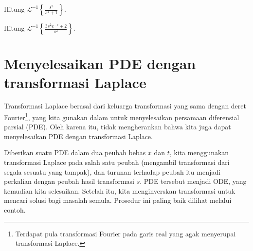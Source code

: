 \begin{exercise}
Hitung
${\mathcal{L}}^{-1} \left\{ \frac{s^2}{s^2+1} \right\}$.
\end{exercise}

\begin{exercise}
Hitung
${\mathcal{L}}^{-1} \left\{ \frac{3 s^2 e^{-s} + 2}{s^2} \right\}$.
\end{exercise}


\sectionnewpage
\section{Menyelesaikan PDE dengan transformasi Laplace}
\label{laplacepde:section}


Transformasi Laplace berasal dari keluarga transformasi yang sama dengan
deret Fourier\footnote{Terdapat pula transformasi Fourier
pada garis real yang agak menyerupai transformasi Laplace.},
yang kita gunakan dalam  untuk menyelesaikan persamaan diferensial
parsial (PDE).
Oleh karena itu, tidak mengherankan bahwa kita juga dapat menyelesaikan PDE dengan transformasi
Laplace.

Diberikan suatu PDE dalam dua peubah bebas $x$ dan $t$, kita menggunakan
transformasi Laplace pada salah satu peubah (mengambil transformasi
dari segala sesuatu yang tampak), dan turunan terhadap peubah itu menjadi
perkalian dengan peubah hasil transformasi $s$.
PDE tersebut menjadi ODE\@, yang kemudian kita selesaikan.
Setelah itu, kita menginverskan transformasi untuk mencari solusi bagi masalah
semula.
Prosedur ini paling baik dilihat melalui contoh.

